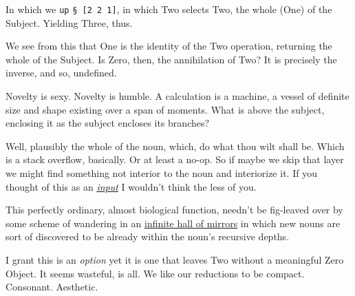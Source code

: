 \documentclass[twoside]{article}
\begin{document}
\noindent
In which we \texttt{up} \lstinline[style=inlinecode]{§ [2 2 1]}, in which Two selects Two, the whole (One) of the Subject. Yielding Three, thus.

We see from this that One is the identity of the Two operation, returning the whole of the Subject. Is Zero, then, the annihilation of Two? It is precisely the inverse, and so, undefined.

Novelty is sexy. Novelty is humble. A calculation is a machine, a vessel of definite size and shape existing over a span of moments. What is above the subject, enclosing it as the subject encloses its branches?

Well, plausibly the whole of the noun, which, do what thou wilt shall be. Which is a stack overflow, basically. Or at least a no-op. So if maybe we skip that layer we might find something not interior to the noun and interiorize it. If you thought of this as an \href{https://en.wikipedia.org/wiki/Pseudopodia}{\emph{input}} I wouldn't think the less of you.

This perfectly ordinary, almost biological function, needn't be fig-leaved over by some scheme of wandering in an \href{https://en.wikipedia.org/wiki/The_Library_of_Babel}{infinite hall of mirrors} in which new nouns are sort of discovered to be already within the noun's recursive depths.

I grant this is an \emph{option} yet it is one that leaves Two without a meaningful Zero Object. It seems wasteful, is all.  We like our reductions to be compact. Consonant. Aesthetic.


\end{document}
